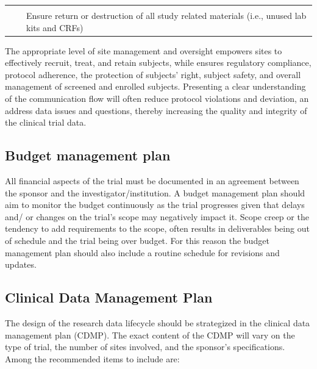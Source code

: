 \documentclass[]{book}
\theoremstyle{definition}
\theoremstyle{definition}
\theoremstyle{definition}
\theoremstyle{remark}
\begin{document}
\begin{longtable}[]{@{}lll@{}}
\begin{minipage}[t]{0.30\columnwidth}
\strut
\end{minipage}\tabularnewline
\begin{minipage}[t]{0.27\columnwidth}\raggedright\strut
\strut
\end{minipage} & \begin{minipage}[t]{0.33\columnwidth}\raggedright\strut
\strut
\end{minipage} & \begin{minipage}[t]{0.30\columnwidth}\raggedright\strut
Ensure return or destruction of all study related materials (i.e.,
unused lab kits and CRFs)\strut
\end{minipage}\tabularnewline
\bottomrule
\end{longtable}

The appropriate level of site management and oversight empowers sites to
effectively recruit, treat, and retain subjects, while ensures
regulatory compliance, protocol adherence, the protection of subjects'
right, subject safety, and overall management of screened and enrolled
subjects. Presenting a clear understanding of the communication flow
will often reduce protocol violations and deviation, an address data
issues and questions, thereby increasing the quality and integrity of
the clinical trial data.

\subsection{Budget management plan}\label{budget-management-plan}

All financial aspects of the trial must be documented in an agreement
between the sponsor and the investigator/institution. A budget
management plan should aim to monitor the budget continuously as the
trial progresses given that delays and/ or changes on the trial's scope
may negatively impact it. Scope creep or the tendency to add
requirements to the scope, often results in deliverables being out of
schedule and the trial being over budget. For this reason the budget
management plan should also include a routine schedule for revisions and
updates.

\subsection{Clinical Data Management
Plan}\label{clinical-data-management-plan}

The design of the research data lifecycle should be strategized in the
clinical data management plan (CDMP). The exact content of the CDMP will
vary on the type of trial, the number of sites involved, and the
sponsor's specifications. Among the recommended items to include are:
\end{document}
